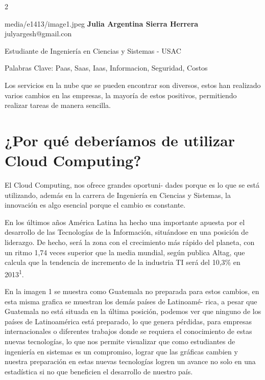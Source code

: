 \documentclass[12pt,spanish,Letterpaper,openany]{book}
\let\BeginKnitrBlock\begin \let\EndKnitrBlock\end
\begin{document}
\begin {multicols}{2}

\BeginKnitrBlock{photobiography3}{media/e1413/image1.jpeg}
\textbf{Julia Argentina Sierra Herrera}\\
julyargesh@gmail.con

\medskip

Estudiante de Ingeniería en Ciencias y Sistemas - USAC\\

\medskip

Palabras Clave: Paas, Saas, Iaas, Informacion, Seguridad, Costos
\EndKnitrBlock{photobiography3}

Los servicios en la nube que se pueden encontrar son diversos, estos han realizado varios cambios en las empresas, la mayoría de estos positivos, permitiendo realizar tareas de manera sencilla.

\hypertarget{por-quuxe9-deberuxedamos-de-utilizar-cloud-computing}{%
\section{¿Por qué deberíamos de utilizar Cloud Computing?}\label{por-quuxe9-deberuxedamos-de-utilizar-cloud-computing}}

El Cloud Computing, nos ofrece grandes oportuni-
dades porque es lo que se está utilizando, además en la carrera de Ingeniería en Ciencias y Sistemas, la innovación es algo esencial porque el cambio es constante.

En los últimos años América Latina ha hecho una importante apuesta por el desarrollo de las Tecnologías de la Información, situándose en una posición de liderazgo. De hecho, será la zona con el crecimiento más rápido del planeta, con un ritmo 1,74 veces superior que la media mundial, según publica Altag, que calcula que la tendencia de incremento de la industria TI será del 10,3\% en 2013\textsuperscript{1}.

En la imagen 1 se muestra como Guatemala no preparada para estos cambios, en esta misma grafica se muestran los demás países de Latinoamé-
rica, a pesar que Guatemala no está situada en la última posición, podemos ver que ninguno de los países de Latinoamérica está preparado, lo que genera pérdidas, para empresas internacionales o diferentes trabajos donde se requiera el conocimiento de estas nuevas tecnologías, lo que nos permite visualizar que como estudiantes de ingeniería en sistemas es un compromiso, lograr que las gráficas cambien y nuestra preparación en estas nuevas tecnologías logren un avance no solo en una estadística si no que beneficien el desarrollo de nuestro país.


\end{multicols}
\end{document}

